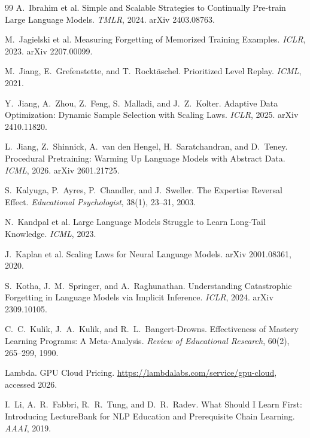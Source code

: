 \documentclass[11pt]{article}
\theoremstyle{plain}
\theoremstyle{definition}
\theoremstyle{remark}
\begin{document}
\begin{thebibliography}{99}
 A.~Ibrahim et al. Simple and Scalable Strategies
to Continually Pre-train Large Language Models. \emph{TMLR}, 2024. arXiv 2403.08763.

 M.~Jagielski et al. Measuring Forgetting
of Memorized Training Examples. \emph{ICLR}, 2023. arXiv 2207.00099.

 M.~Jiang, E.~Grefenstette, and T.~Rockt\"aschel. Prioritized
Level Replay. \emph{ICML}, 2021.

 Y.~Jiang, A.~Zhou, Z.~Feng, S.~Malladi, and J.~Z.~Kolter.
Adaptive Data Optimization: Dynamic Sample Selection with Scaling Laws. \emph{ICLR}, 2025.
arXiv 2410.11820.

 L.~Jiang, Z.~Shinnick, A.~van den Hengel, H.~Saratchandran,
and D.~Teney. Procedural Pretraining: Warming Up Language Models with Abstract Data. \emph{ICML},
2026. arXiv 2601.21725.

 S.~Kalyuga, P.~Ayres, P.~Chandler, and
J.~Sweller. The Expertise Reversal Effect. \emph{Educational Psychologist}, 38(1), 23--31, 2003.

 N.~Kandpal et al. Large Language Models Struggle to
Learn Long-Tail Knowledge. \emph{ICML}, 2023.

 J.~Kaplan et al. Scaling Laws for Neural Language
Models. arXiv 2001.08361, 2020.

 S.~Kotha, J.~M.~Springer, and A.~Raghunathan.
Understanding Catastrophic Forgetting in Language Models via Implicit Inference. \emph{ICLR}, 2024.
arXiv 2309.10105.

 C.~C.~Kulik, J.~A.~Kulik, and
R.~L.~Bangert-Drowns. Effectiveness of Mastery Learning Programs: A Meta-Analysis. \emph{Review of
Educational Research}, 60(2), 265--299, 1990.

 Lambda. GPU Cloud Pricing.
\url{https://lambdalabs.com/service/gpu-cloud}, accessed 2026.

 I.~Li, A.~R.~Fabbri, R.~R.~Tung, and D.~R.~Radev. What
Should I Learn First: Introducing LectureBank for NLP Education and Prerequisite Chain Learning.
\emph{AAAI}, 2019.


\end{thebibliography}
\end{document}

